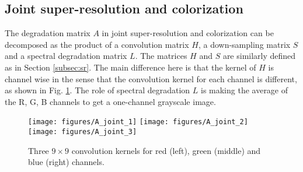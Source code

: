 \documentclass[10pt,twocolumn,letterpaper]{article}
\begin{document}
\begin{appendices}
\subsection{Joint super-resolution and colorization}
The degradation matrix $A$ in joint super-resolution and colorization can be decomposed as 
the product of a convolution matrix $H$, a down-sampling matrix $S$ and a spectral degradation matrix $L$.
The matrices $H$ and $S$ are similarly defined as in Section \ref{subsec:sr}. The main difference here
is that the kernel of $H$ is channel wise in the sense that the convolution kernel for each channel is 
different, as shown in Fig. \ref{fig:joint_kernel}. The role of spectral degradation $L$ is making the average
of the R, G, B channels to get a one-channel grayscale image.

\begin{figure}[H]
\centering
\texttt{[image: figures/A\_joint\_1]}
\texttt{[image: figures/A\_joint\_2]}
\texttt{[image: figures/A\_joint\_3]}
\caption{{Three $9 \times 9$ convolution kernels for red (left), green (middle) and blue (right) channels.}}
\label{fig:joint_kernel}
\end{figure}

\end{appendices}
\end{document}
